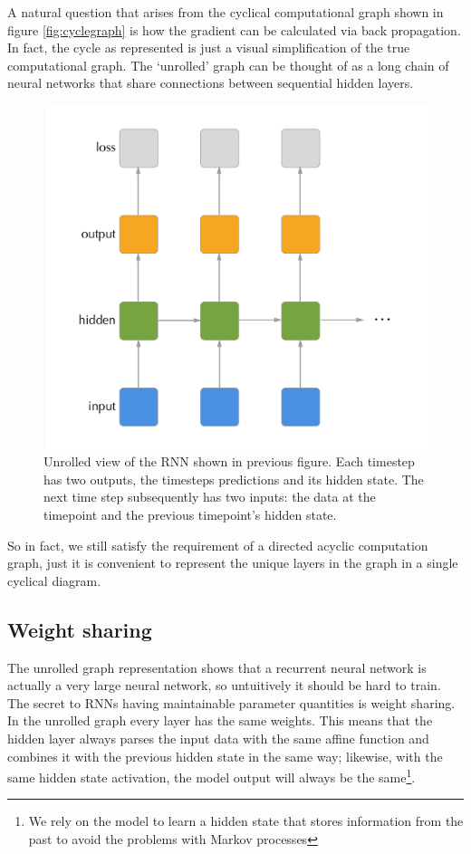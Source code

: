 \documentclass[]{book}
\let\rmarkdownfootnote\footnote%
\def\footnote{\protect\rmarkdownfootnote}
\theoremstyle{definition}
\theoremstyle{definition}
\theoremstyle{definition}
\theoremstyle{remark}
\begin{document}
A natural question that arises from the cyclical computational graph
shown in figure \ref{fig:cyclegraph} is how the gradient can be
calculated via back propagation. In fact, the cycle as represented is
just a visual simplification of the true computational graph. The
`unrolled' graph can be thought of as a long chain of neural networks
that share connections between sequential hidden layers.

\begin{figure}

{\centering \includegraphics[width=0.65\linewidth]{figures/rnn_unrolled} 

}

\caption{Unrolled view of the RNN shown in previous figure. Each timestep has two outputs, the timesteps predictions and its hidden state. The next time step subsequently has two inputs: the data at the timepoint and the previous timepoint's hidden state.}\label{fig:unrolledgraph}
\end{figure}

So in fact, we still satisfy the requirement of a directed acyclic
computation graph, just it is convenient to represent the unique layers
in the graph in a single cyclical diagram.

\subsection{Weight sharing}\label{weight-sharing}

The unrolled graph representation shows that a recurrent neural network
is actually a very large neural network, so untuitively it should be
hard to train. The secret to RNNs having maintainable parameter
quantities is weight sharing. In the unrolled graph every layer has the
same weights. This means that the hidden layer always parses the input
data with the same affine function and combines it with the previous
hidden state in the same way; likewise, with the same hidden state
activation, the model output will always be the same\footnote{We rely on
  the model to learn a hidden state that stores information from the
  past to avoid the problems with Markov processes}.
\end{document}
